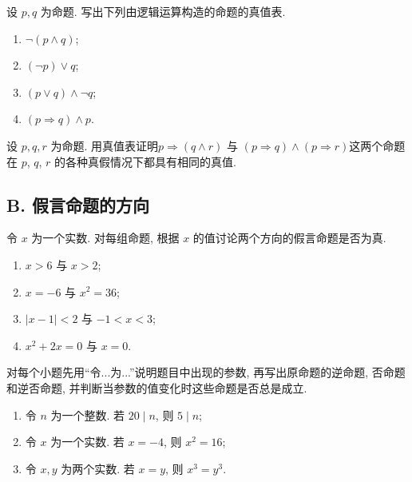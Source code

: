 \documentclass[usesamecnt, thmcnt=section, lang=cn, newtx, 10pt, scheme=chinese]{elegantbook}
\begin{document}
\begin{exercise}
\label{ex:logic-18}
设 $p,q$ 为命题. 写出下列由逻辑运算构造的命题的真值表.
\begin{enumerate}[label=\rm(\arabic*)]
  \item $\neg(p\wedge q)$;
  \item $(\neg p)\vee q$;
  \item $(p\vee q)\wedge\neg q$;
  \item $(p\Rightarrow q)\wedge p$.
\end{enumerate}
\end{exercise}

\begin{exercise}
\label{ex:logic-19}
设 $p,q,r$ 为命题. 用真值表证明$p\Rightarrow(q\wedge r)$ 与 $(p\Rightarrow q)\wedge(p\Rightarrow r)$这两个命题在 $p$, $q$, $r$ 的各种真假情况下都具有相同的真值.

\end{exercise}

\subsection*{B. 假言命题的方向}

\begin{exercise}
\label{ex:logic-20}
令 $x$ 为一个实数. 对每组命题, 根据 $x$ 的值讨论两个方向的假言命题是否为真.
\begin{enumerate}[label=\rm(\arabic*)]
  \item $x>6$ 与 $x>2$;
  \item $x=-6$ 与 $x^2=36$;
  \item $|x-1|<2$ 与 $-1<x<3$;
  \item $x^2+2x=0$ 与 $x=0$.
\end{enumerate}
\end{exercise}

\begin{exercise}
\label{ex:logic-21}
对每个小题先用``令...为...''说明题目中出现的参数, 再写出原命题的逆命题, 否命题和逆否命题, 并判断当参数的值变化时这些命题是否总是成立.
\begin{enumerate}[label=\rm(\arabic*)]
  \item 令 $n$ 为一个整数. 若 $20\mid n$, 则 $5\mid n$;
  \item 令 $x$ 为一个实数. 若 $x=-4$, 则 $x^2=16$;
  \item 令 $x,y$ 为两个实数. 若 $x=y$, 则 $x^3=y^3$.
\end{enumerate}
\end{exercise}
\end{document}
